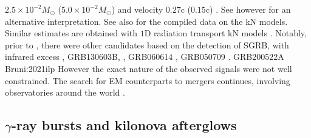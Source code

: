 $2.5\times10^{-2}M_{\odot}$ ($5.0\times10^{-2}M_{\odot}$) and velocity $0.27$c ($0.15$c)
\citep{Cowperthwaite:2017dyu,Villar:2017wcc}. 
See however \citep{Waxman:2017sqv} for an alternative interpretation.
See also \citep{Siegel:2019mlp} for the compiled data on the \ac{kN} models.
%
Similar estimates are obtained with $1$D radiation transport \ac{kN} models
\citep{Tanvir:2017pws,Tanaka:2017qxj}.
%
% 
Notably, prior to \AT{}, there were other candidates based on the detection of \ac{SGRB}, 
with infrared excess \eg, 
GRB130603B, \citep{Berger:2013wna,Tanvir:2013pia}, 
GRB060614 \citep{Jin:2015txa,Yang:2015pha}, 
GRB050709 \citep{Jin:2016pnm}.
GRB200522A \citep{WRONG}  Bruni:2021ilp
However the exact nature of the observed signals were not well constrained. 
%
The search for \ac{EM} counterparts to mergers continues, involving observatories around the world 
\citep{Law:2009,Singer:2014qca,Bellm:2014,Kasliwal:2016uhu}.


\subsection{$\gamma$-ray bursts and kilonova afterglows}

